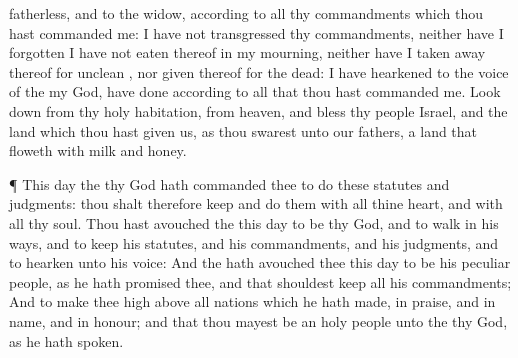 {fatherless, and to the
widow, according to all thy
commandments which thou hast
commanded me: I have not
transgressed thy
commandments, neither have I
forgotten
{}
I have not
eaten thereof in my
mourning, neither have I taken
away
{} thereof for
{}
unclean
{}, nor
given
{} thereof for the
dead:
{} I have
hearkened to the
voice of the
{} my
God,
{} have
done according to all that thou hast
commanded me.
Look
down from thy
holy
habitation, from
heaven, and
bless thy
people
Israel, and the
land which thou hast
given us, as thou
swarest unto our
fathers, a
land that
floweth with
milk and
honey.
\par }{\PP {}¶ This
day the
{} thy
God hath
commanded thee to
do these
statutes and
judgments: thou shalt therefore
keep and
do them with all thine
heart, and with all thy
soul.
Thou hast
avouched the
{} this
day to be thy
God, and to
walk in his
ways, and to
keep his
statutes, and his
commandments, and his
judgments, and to
hearken unto his
voice:
And the
{} hath
avouched thee this
day to be his
peculiar
people, as he hath
promised thee, and that
{} shouldest
keep all his
commandments;
And to
make thee
high above all
nations which he hath
made, in
praise, and in
name, and in
honour; and that thou mayest be an
holy
people unto the
{} thy
God, as he hath
spoken.

}
